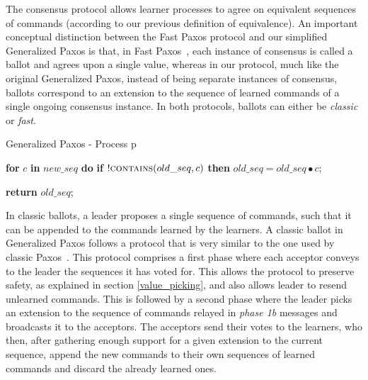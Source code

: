 The consensus protocol allows learner processes to agree on equivalent sequences of commands (according to our previous definition of equivalence).
An important conceptual distinction between the Fast Paxos protocol and our simplified Generalized Paxos is that, in Fast Paxos~\cite{Lamport2006}, each instance of consensus is called a ballot and agrees upon a single value, whereas in our protocol, much like the original Generalized Paxos, instead of being separate instances of consensus, ballots correspond to an extension to the sequence of learned commands of a single ongoing consensus instance. In both protocols, ballots can either be \textit{classic} or \textit{fast}. \par
\begin{algorithm}
	\caption{Generalized Paxos - Process p}
	\begin{algorithmic}[1]
		
		\State \textbf{for} $c$ \textbf{in} $new\_seq$ \textbf{do} 
		\State \hspace{\algorithmicindent} \textbf{if} $!\Call{contains}{old\_seq,c}$ \textbf{then}
		\State \hspace{\algorithmicindent}\hspace{\algorithmicindent}\hspace{\algorithmicindent} $old\_seq =  old\_seq \bullet c$;

		\State \textbf{return} $old\_seq$;
		\EndFunction
	\end{algorithmic}
\end{algorithm}
In classic ballots, a leader proposes a single sequence of commands, such that it can be appended to the commands learned by the learners. 
A classic ballot in Generalized Paxos follows a protocol that is very similar to the one used by classic Paxos~\cite{Lamport:1998}. This protocol comprises a first phase where each acceptor conveys to the leader the sequences it has voted for. This allows the protocol to preserve safety, as explained in section \ref{value_picking}, and also allows leader to resend unlearned commands.
This is followed by a second phase where the leader picks an extension to the sequence of commands relayed in \textit{phase 1b} messages and broadcasts it to the acceptors. The acceptors send their votes to the learners, who then, after gathering enough support for a given extension to the current sequence, append the new commands to their own sequences of learned commands and discard the already learned ones.\par

